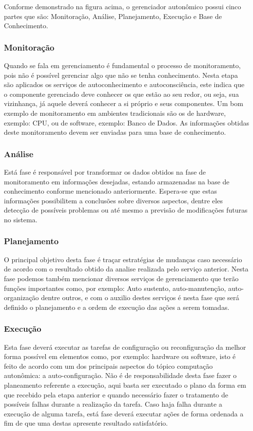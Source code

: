 \documentclass[11pt,twoside]{article}
\begin{document}
Conforme demonstrado na figura acima, o gerenciador autonômico possui cinco partes que são: Monitoração, Análise, Planejamento, Execução e Base de Conhecimento.

\subsubsection{Monitoração} 
Quando se fala em gerenciamento é fundamental o processo de monitoramento, pois não é possível gerenciar algo que não se tenha conhecimento. Nesta etapa são aplicados os serviços de autoconhecimento e autoconsciência, este indica que o componente gerenciado deve conhecer os que estão ao seu redor, ou seja, sua vizinhança, já aquele deverá conhecer a si próprio e seus componentes. Um bom exemplo de monitoramento em ambientes tradicionais são os de hardware, exemplo: CPU, ou de software, exemplo: Banco de Dados. As informações obtidas deste monitoramento devem ser enviadas para uma base de conhecimento.

\subsubsection{Análise}
Está fase é responsável por transformar os dados obtidos na fase de monitoramento em informações desejadas, estando armazenadas na base de conhecimento conforme mencionado anteriormente. Espera-se que estas informações possibilitem a conclusões sobre diversos aspectos, dentre eles detecção de possíveis problemas ou até mesmo a previsão de modificações futuras no sistema.

\subsubsection{Planejamento}
O principal objetivo desta fase é traçar estratégias de mudanças caso necessário de acordo com o resultado obtido da analise realizada pelo serviço anterior. Nesta fase podemos também mencionar diversos serviços de gerenciamento que terão funções importantes como, por exemplo: Auto sustento, auto-manutenção, auto-organização dentre outros, e com o auxilio destes serviços é nesta fase que será definido o planejamento e a ordem de execução das ações a serem tomadas.

\subsubsection{Execução}
Esta fase deverá executar as tarefas de configuração ou reconfiguração da melhor forma possível em elementos como, por exemplo: hardware ou software, isto é feito de acordo com um dos principais aspectos do tópico computação autonômica: a auto-configuração. Não é de responsabilidade desta fase fazer o planeamento referente a execução, aqui basta ser executado o plano da forma em que recebido pela etapa anterior e quando necessário fazer o tratamento de possíveis falhas durante a realização da tarefa. Caso haja falha durante a execução de alguma tarefa, está fase deverá executar ações de forma ordenada a fim de que uma destas apresente resultado satisfatório.
\end{document}
